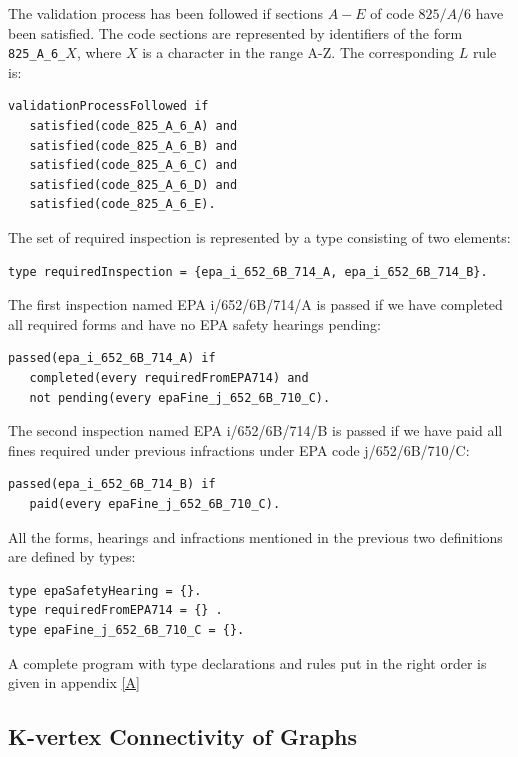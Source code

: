 \documentclass[a4paper,10pt]{article}
\begin{document}
\medskip\noindent
The validation process has been followed if sections $A-E$ of code  $825/A/6$ have been satisfied. The code sections are represented by identifiers of the form \texttt{825\_A\_6\_}$X$, where $X$ is a character in the range A-Z. The corresponding $L$ rule is:

\begin{verbatim}
validationProcessFollowed if
   satisfied(code_825_A_6_A) and
   satisfied(code_825_A_6_B) and
   satisfied(code_825_A_6_C) and
   satisfied(code_825_A_6_D) and
   satisfied(code_825_A_6_E).
\end{verbatim}


\medskip\noindent
The set of required inspection is represented by a type consisting of two elements:
\begin{verbatim}
type requiredInspection = {epa_i_652_6B_714_A, epa_i_652_6B_714_B}.
\end{verbatim} 

\medskip\noindent
The first inspection named EPA i/652/6B/714/A is  passed if we have completed all 
   required forms and have no EPA safety hearings pending:

\begin{verbatim}
passed(epa_i_652_6B_714_A) if
   completed(every requiredFromEPA714) and
   not pending(every epaFine_j_652_6B_710_C).
\end{verbatim}

\medskip\noindent
The second inspection named  EPA i/652/6B/714/B is passed if we have paid all fines 
required under previous infractions under EPA code j/652/6B/710/C:

\begin{verbatim}
passed(epa_i_652_6B_714_B) if
   paid(every epaFine_j_652_6B_710_C).
\end{verbatim}

\medskip\noindent
All the forms, hearings and infractions mentioned in the previous two definitions are defined by types:

\begin{verbatim}
type epaSafetyHearing = {}.
type requiredFromEPA714 = {} .
type epaFine_j_652_6B_710_C = {}.
\end{verbatim}

\medskip\noindent
A complete program with type declarations and rules put in the right order is given in appendix \ref{A}
   
\subsection{K-vertex Connectivity of Graphs}
\end{document}

